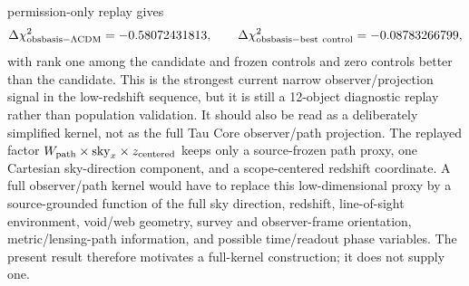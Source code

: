 \documentclass[11pt]{article}
\begin{document}
permission-only replay gives
\[
  \Delta\chi^2_{\rm obsbasis-\Lambda CDM}=-0.58072431813,\qquad
  \Delta\chi^2_{\rm obsbasis-best\ control}=-0.08783266799,
\]
with rank one among the candidate and frozen controls and zero controls better
than the candidate.  This is the strongest current narrow observer/projection
signal in the low-redshift sequence, but it is still a 12-object diagnostic
replay rather than population validation.  It should also be read as a
deliberately simplified kernel, not as the full Tau Core observer/path
projection.  The replayed factor
\(W_{\rm path}\times\mathrm{sky}_x\times z_{\rm centered}\) keeps only a
source-frozen path proxy, one Cartesian sky-direction component, and a
scope-centered redshift coordinate.  A full observer/path kernel would have to
replace this low-dimensional proxy by a source-grounded function of the full
sky direction, redshift, line-of-sight environment, void/web geometry, survey
and observer-frame orientation, metric/lensing-path information, and possible
time/readout phase variables.  The present result therefore motivates a
full-kernel construction; it does not supply one.
\end{document}
